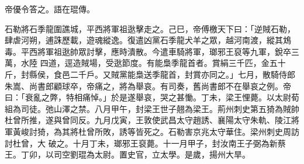 \begin{pinyinscope}
 帝優令答之。語在琨傳。



 石勒將石季龍圍譙城，平西將軍祖逖擊走之。己巳，帝傅檄天下曰：「逆賊石勒，肆虐河朔，逋誅歷載，遊魂縱逸。復遣凶黨石季龍犬羊之眾，越河南渡，縱其鴆毒。平西將軍祖逖帥眾討擊，應時潰散。今遣車騎將軍，瑯邪王裒等九軍，銳卒三萬，水陸
 四道，逕造賊場，受逖節度。有能梟季龍首者。賞絹三千匹，金五十斤，封縣侯，食邑二千戶。又賊黨能梟送季龍首，封賞亦同之。」七月，散騎侍郎朱嵩、尚書郎顧球卒，帝痛之，將為舉哀。有司奏，舊尚書郎不在舉哀之例。帝曰：「衰亂之弊，特相痛悼。」於是遂舉哀，哭之甚慟。丁未，梁王悝薨。以太尉荀組為司徒。弛山澤之禁。八月甲午，封梁王世子翹為梁王。荊州刺史第五猗為賊帥杜曾所推，遂與曾同反。九月戊寅，王敦使武昌太守趙誘、襄陽太守朱軌、陵江將軍黃峻討猗，為其將杜曾所敗，誘等皆死之。石勒害京兆太守華住。梁州刺史周訪討杜曾，大
 破之。十月丁未，瑯邪王裒薨。十一月甲子，封汝南王子弼為新蔡王。丁卯，以司空劉琨為太尉。置史官，立太學。是歲，揚州大旱。




\end{pinyinscope}
